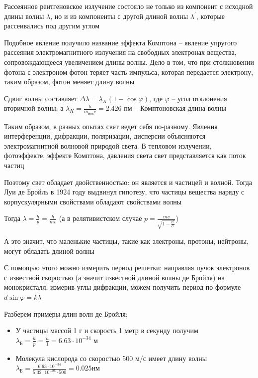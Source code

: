 \documentclass[12pt]{article}
\begin{document}

Рассеянное рентгеновское излучение состояло не только из компонент с исходной длины волны $\lambda$, но и из компоненты с другой длиной волны $\lambda^\prime$, которые рассеивались под другим углом

Подобное явление получило название эффекта Комптона -- явление упругого рассеяния электромагнитного излучения на свободных электронах вещества, сопровождающееся увеличением длины волны. Дело в том, что при столкновении фотона с электроном фотон теряет часть импульса, которая передается электрону, таким образом, фотон меняет длину волны

Сдвиг волны составляет $\Delta \lambda = \lambda_K (1 - \cos\varphi)$, где $\varphi$ -- угол отклонения вторичной волны, а $\lambda_K = \frac{h}{m_{\text{пок}} c} = 2.426$ пм -- Комптоновская длина волны

\mediumvspace

Таким образом, в разных опытах свет ведет себя по-разному. Явления интерференции, дифракции, поляризации, дисперсии объясняются электромагнитной волновой природой света. В тепловом излучении, фотоэффекте, эффекте Комптона, давления света свет представляется как поток частиц

Поэтому свет обладает двойственностью: он является и частицей и волной. Тогда Луи де Бройль в 1924 году выдвинул гипотезу, что частицы вещества наряду с корпускулярными свойствами обладают свойствами волны

Тогда $\lambda = \frac{h}{p} = \frac{h}{mv}$ (а в релятивистском случае $p = \frac{mv}{\sqrt{1 - \frac{v^2}{c^2}}}$)

А это значит, что маленькие частицы, такие как электроны, протоны, нейтроны, могут обладать длиной волны

С помощью этого можно измерить период решетки: направляя пучок электронов с известной скоростью (а значит известной длиной волны де Бройля) на монокристалл, измерив углы дифракции, можем получить период по формуле $d \sin \varphi = k \lambda$








Разберем примеры длин волн де Бройля:

\begin{itemize}
    \item У частицы массой 1 г и скорость 1 метр в секунду получим $\lambda_{\text{Б}} = \frac{h}{p} = \frac{h}{1} = 6.63 \cdot 10^{-34}$ м

    \item Молекула кислорода со скоростью 500 м/с имеет длину волны $\lambda_{\text{Б}} = \frac{6.63 \cdot 10^{-34}}{5.32 \cdot 10^{-26} \cdot 500} = 0.025 \text{нм}$
\end{itemize}
\end{document}
